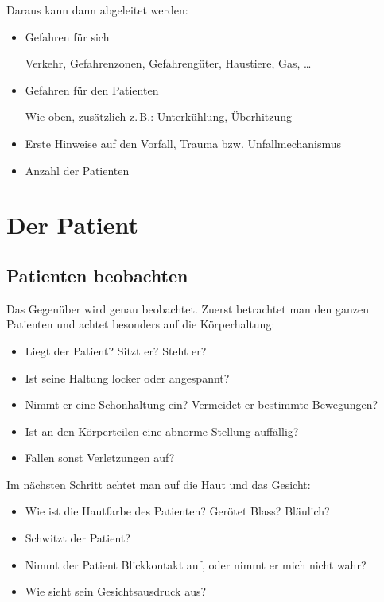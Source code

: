 Daraus kann dann abgeleitet werden:

\begin{itemize}
  \item Gefahren für sich
  
  Verkehr, Gefahrenzonen, Gefahrengüter, Haustiere, Gas, \ldots
  \item Gefahren für den Patienten
  
  Wie oben, zusätzlich z.\,B.: Unterkühlung, Überhitzung
  \item Erste Hinweise auf den Vorfall, Trauma bzw.
  Unfallmechanismus
  \item Anzahl der Patienten
\end{itemize}

\section{Der Patient}

\subsection{Patienten beobachten}

Das Gegenüber wird genau beobachtet. Zuerst betrachtet
man den ganzen Patienten und achtet besonders auf die
Körperhaltung:
\begin{itemize}
  \item Liegt der Patient? Sitzt er? Steht er?
  \item Ist seine Haltung locker oder angespannt?
  \item Nimmt er eine Schonhaltung ein? Vermeidet er
  bestimmte Bewegungen?
  \item Ist an den Körperteilen eine abnorme Stellung
  auffällig?
  \item Fallen sonst Verletzungen auf?
\end{itemize}

Im nächsten Schritt achtet man auf die Haut und das Gesicht:

\begin{itemize}
  \item Wie ist die Hautfarbe des Patienten? Gerötet Blass?
  Bläulich?
  \item Schwitzt der Patient?
  \item Nimmt der Patient Blickkontakt auf, oder nimmt er
  mich nicht wahr?
  \item Wie sieht sein Gesichtsausdruck aus?
\end{itemize}

